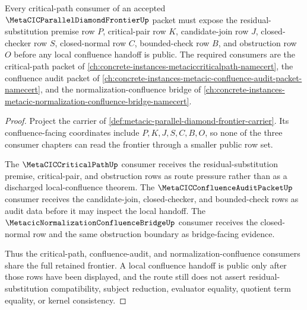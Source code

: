 \begin{theorem}
\label{thm:metacic-parallel-diamond-frontier-critical-path-consumer-route}
Every critical-path consumer of an accepted $\MetaCICParallelDiamondFrontierUp$ packet must expose the residual-substitution premise row $P$, critical-pair row $K$, candidate-join row $J$, closed-checker row $S$, closed-normal row $C$, bounded-check row $B$, and obstruction row $O$ before any local confluence handoff is public. The required consumers are the critical-path packet of \autoref{ch:concrete-instances-metaciccriticalpath-namecert}, the confluence audit packet of \autoref{ch:concrete-instances-metacic-confluence-audit-packet-namecert}, and the normalization-confluence bridge of \autoref{ch:concrete-instances-metacic-normalization-confluence-bridge-namecert}.
\end{theorem}
\begin{proof}
Project the carrier of \autoref{def:metacic-parallel-diamond-frontier-carrier}. Its confluence-facing coordinates include $P,K,J,S,C,B,O$, so none of the three consumer chapters can read the frontier through a smaller public row set.

The $\MetaCICCriticalPathUp$ consumer receives the residual-substitution premise, critical-pair, and obstruction rows as route pressure rather than as a discharged local-confluence theorem. The $\MetaCICConfluenceAuditPacketUp$ consumer receives the candidate-join, closed-checker, and bounded-check rows as audit data before it may inspect the local handoff. The $\MetacicNormalizationConfluenceBridgeUp$ consumer receives the closed-normal row and the same obstruction boundary as bridge-facing evidence.

Thus the critical-path, confluence-audit, and normalization-confluence consumers share the full retained frontier. A local confluence handoff is public only after those rows have been displayed, and the route still does not assert residual-substitution compatibility, subject reduction, evaluator equality, quotient term equality, or kernel consistency.
\end{proof}
